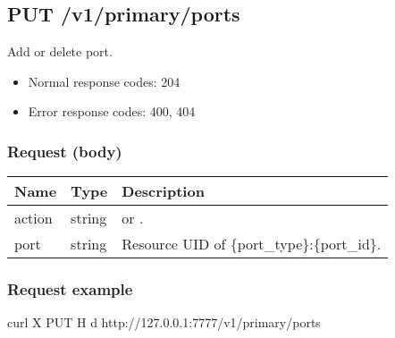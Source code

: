 \documentclass[a4paper,11pt,openany,oneside,english]{sphinxmanual}
\begin{document}
\subsection{PUT /v1/primary/ports}
\label{\detokenize{api_ref/spp_primary:put-v1-primary-ports}}
Add or delete port.
\begin{itemize}
\item {} 
Normal response codes: 204

\item {} 
Error response codes: 400, 404

\end{itemize}


\subsubsection{Request (body)}
\label{\detokenize{api_ref/spp_primary:request-body}}

\begin{savenotes}\sphinxattablestart
\centering
{}
\sphinxthecaptionisattop
{}\label{\detokenize{api_ref/spp_primary:id24}}\label{\detokenize{api_ref/spp_primary:table-spp-ctl-spp-primary-ports-get-body}}
\sphinxaftertopcaption
\begin{tabulary}{\linewidth}[t]{|T|T|T|}
\hline
\sphinxstyletheadfamily 
Name
&\sphinxstyletheadfamily 
Type
&\sphinxstyletheadfamily 
Description
\\
\hline
action
&
string
&
 or .
\\
\hline
port
&
string
&
Resource UID of \{port\_type\}:\{port\_id\}.
\\
\hline
\end{tabulary}
\par
\sphinxattableend\end{savenotes}


\subsubsection{Request example}
\label{\detokenize{api_ref/spp_primary:id3}}
\begin{sphinxVerbatim}[commandchars=\\\{\},formatcom=\footnotesize]
 curl \PYGZhy{}X PUT \PYGZhy{}H  
  \PYGZhy{}d  
  http://127.0.0.1:7777/v1/primary/ports
\end{sphinxVerbatim}
\end{document}
